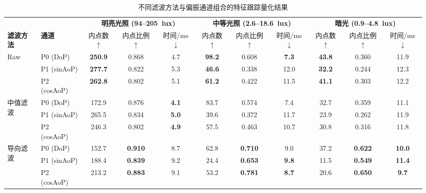 
\begin{table}[t]
\centering
\caption{不同滤波方法与偏振通道组合的特征跟踪量化结果}
\label{tab:filter_metrics}
\footnotesize
\setlength{\tabcolsep}{3.5pt}
\begin{tabular}{llccccccccc}
\toprule
& & \multicolumn{3}{c}{\bfseries 明亮光照 (94--205~lux)} & \multicolumn{3}{c}{\bfseries 中等光照 (2.6--18.6~lux)} & \multicolumn{3}{c}{\bfseries 暗光 (0.9--4.8~lux)} \\
\cmidrule(lr){3-5} \cmidrule(lr){6-8} \cmidrule(lr){9-11}
\multirow{-2}{*}{\bfseries 滤波方法} & \multirow{-2}{*}{\bfseries 通道} & 内点数$\uparrow$ & 内点比例$\uparrow$ & 时间/ms$\downarrow$ & 内点数$\uparrow$ & 内点比例$\uparrow$ & 时间/ms$\downarrow$ & 内点数$\uparrow$ & 内点比例$\uparrow$ & 时间/ms$\downarrow$ \\
\midrule

\multirow{3}{*}{Raw}
    & P0 (DoP)     & \textbf{250.9} & 0.868 & 4.7  & \textbf{98.2} & 0.608 & \textbf{7.3}  & \textbf{43.8} & 0.360 & 11.9 \\
    & P1 (sinAoP)  & \textbf{277.7} & 0.822 & 5.3  & \textbf{46.6} & 0.338 & 12.0 & \textbf{32.2} & 0.244 & 12.3 \\
    & P2 (cosAoP)  & \textbf{262.8} & 0.802 & 5.1  & \textbf{61.2} & 0.422 & 11.5 & \textbf{41.1} & 0.303 & 12.2 \\
\cmidrule{2-11}

\multirow{3}{*}{中值滤波}
    & P0 (DoP)     & 172.9 & 0.876 & \textbf{4.1}  & 83.7  & 0.574 & 7.4  & 32.7  & 0.359 & 11.1 \\
    & P1 (sinAoP)  & 265.5 & 0.834 & \textbf{5.0}  & 39.6  & 0.372 & 11.7 & 23.9  & 0.262 & 11.9 \\
    & P2 (cosAoP)  & 246.3 & 0.802 & \textbf{4.9}  & 57.5  & 0.463 & 10.7 & 30.8  & 0.316 & 11.8 \\
\cmidrule{2-11}

\multirow{3}{*}{导向滤波}
    & P0 (DoP)     & 152.7 & \textbf{0.910} & 8.7  & 62.8  & \textbf{0.710} & 9.0  & 37.2  & \textbf{0.622} & \textbf{10.0} \\
    & P1 (sinAoP)  & 188.4 & \textbf{0.839} & 9.2  & 24.4  & \textbf{0.653} & \textbf{9.8}  & 11.5  & \textbf{0.549} & \textbf{11.4} \\
    & P2 (cosAoP)  & 213.2 & \textbf{0.883} & 9.1  & 53.2  & \textbf{0.781} & \textbf{8.7}  & 20.6  & \textbf{0.650} & \textbf{9.7} \\
\cmidrule{2-11}


\end{tabular}
\end{table}
